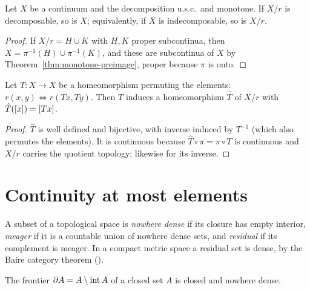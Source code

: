 
\begin{corollary}\label{cor:monotone-decomposable}
Let $X$ be a continuum and the decomposition u.s.c.\ and monotone. If $X/r$ is decomposable, so is
$X$; equivalently, if $X$ is indecomposable, so is $X/r$.
\end{corollary}

\begin{proof}
If $X/r=H\cup K$ with $H,K$ proper subcontinua, then $X=\pi^{-1}(H)\cup\pi^{-1}(K)$, and these are
subcontinua of $X$ by Theorem~\ref{thm:monotone-preimage}, proper because $\pi$ is onto.
\end{proof}


\begin{proposition}\label{prop:homeo-descends}
Let $T\colon X\to X$ be a homeomorphism permuting the elements: $r(x,y)\iff r(Tx,Ty)$. Then $T$ induces a
homeomorphism $\hat T$ of $X/r$ with $\hat T([x])=[Tx]$.
\end{proposition}

\begin{proof}
$\hat T$ is well defined and bijective, with inverse induced by $T^{-1}$ (which also permutes the
elements). It is continuous because $\hat T\circ\pi=\pi\circ T$ is continuous and $X/r$ carries the
quotient topology; likewise for its inverse.
\end{proof}


\section{Continuity at most elements}

A subset of a topological space is \emph{nowhere dense} if its closure has empty interior,
\emph{meager} if it is a countable union of nowhere dense sets, and \emph{residual} if its complement
is meager. In a compact metric space a residual set is dense, by the Baire category theorem
().

\begin{lemma}\label{lem:frontier-nd}
The frontier $\partial A=A\setminus\operatorname{int} A$ of a closed set $A$ is closed and nowhere dense.
\end{lemma}

